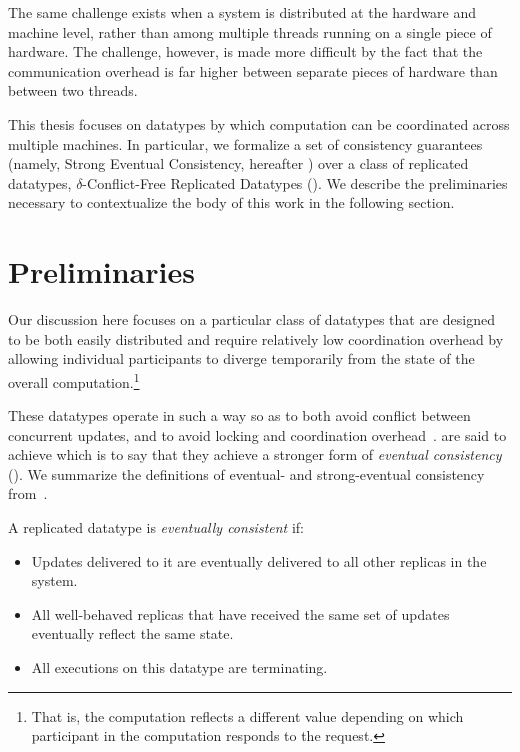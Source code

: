 The same challenge exists when a system is distributed at the hardware and
machine level, rather than among multiple threads running on a single piece of
hardware. The challenge, however, is made more difficult by the fact that the
communication overhead is far higher between separate pieces of hardware than
between two threads.

This thesis focuses on datatypes by which computation can be coordinated across
multiple machines. In particular, we formalize a set of consistency guarantees
(namely, Strong Eventual Consistency, hereafter \SEC) over a class of replicated
datatypes, $\delta$-Conflict-Free Replicated Datatypes (\CRDTs). We describe the
preliminaries necessary to contextualize the body of this work in the following
section.

\section{Preliminaries}
Our discussion here focuses on a particular class of datatypes that are designed
to be both easily distributed and require relatively low coordination overhead
by allowing individual participants to diverge temporarily from the state of the
overall computation.\footnote{That is, the computation reflects a different
value depending on which participant in the computation responds to the
request.}

These datatypes operate in such a way so as to both avoid conflict between
concurrent updates, and to avoid locking and coordination
overhead~\citep{shapiro11}. \CRDTs are said to achieve \SEC which is to say that
they achieve a stronger form of \textit{eventual consistency} (\EC). We
summarize the definitions of eventual- and strong-eventual consistency
from~\cite{shapiro11}.

\begin{definition}
  \label{def:eventual-consistency}
  A replicated datatype is \textit{eventually consistent} if:
  \begin{itemize}
    \item Updates delivered to it are eventually delivered to all other replicas
      in the system.
    \item All well-behaved replicas that have received the same set of updates
      eventually reflect the same state.
    \item All executions on this datatype are terminating.
  \end{itemize}
\end{definition}

